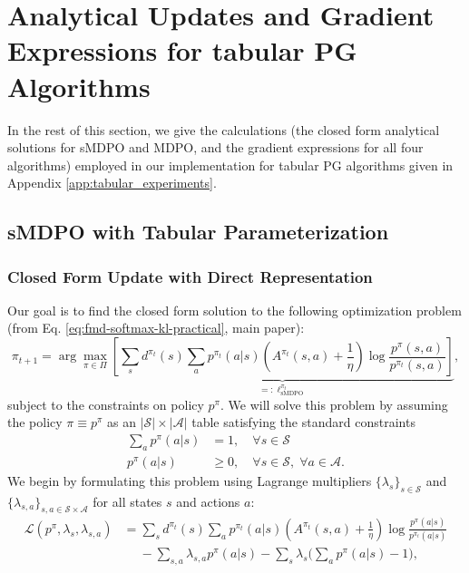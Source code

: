 \documentclass[a4paper, 10pt]{article}
\begin{document}
\section{Analytical Updates and Gradient Expressions for tabular PG Algorithms} \label{app:tabular_derivations}
In the rest of this section, we give the calculations (the closed form analytical solutions for sMDPO and MDPO, and the gradient expressions for all four algorithms) employed in our implementation for tabular PG algorithms given in Appendix \ref{app:tabular_experiments}.

\subsection{sMDPO with Tabular Parameterization}
\subsubsection{Closed Form Update with Direct Representation}
Our goal is to find the closed form solution to the following optimization problem (from Eq. \ref{eq:fmd-softmax-kl-practical}, main paper):
\begin{equation}
  \pi_{t+1} = \arg\max_{\pi \in \Pi} \underbrace{\left[ \sum_s d^{\pi_t}(s) \sum_a p^{\pi_t}(a | s) \left(A^{\pi_t}(s, a) + \frac{1}{\eta} \right) \log \frac{p^\pi(s, a)}{p^{\pi_t}(s, a)} \right]}_{=: \ell^{\pi_t}_{\text{sMDPO}}}, \label{eq: optim_problem_sppo}
\end{equation}
subject to the constraints on policy $p^\pi$. We will solve this problem by assuming the policy $\pi \equiv p^\pi$ as an $|\mathcal{S}| \times |\mathcal{A}|$ table satisfying the standard constraints
\begin{align*}
  \sum_a p^\pi(a | s) &= 1,  \quad \forall s \in \mathcal{S} \\
  p^\pi(a | s) &\geq 0,  \quad \forall s \in \mathcal{S}, \; \forall a \in \mathcal{A}.
\end{align*}
We begin by formulating this problem using Lagrange multipliers $\{\lambda_s\}_{s \in \mathcal{S}}$ and $\{\lambda_{s, a}\}_{s, a \in \mathcal{S} \times \mathcal{A}}$ for all states $s$ and actions $a$:
\begin{align}
  \mathcal{L}(p^\pi, \lambda_s, \lambda_{s, a}) &= \sum_s d^{\pi_t}(s) \sum_a p^{\pi_t}(a | s) \left(A^{\pi_t}(s, a) + \frac{1}{\eta} \right) \log \frac{p^\pi(a | s)}{p^{\pi_t}(a | s)} \nonumber \\
  & \quad \; - \sum_{s, a} \lambda_{s, a} p^\pi(a | s) - \sum_s \lambda_{s} \bigg( \sum_a p^\pi(a | s) - 1 \bigg),
\end{align}
\end{document}
